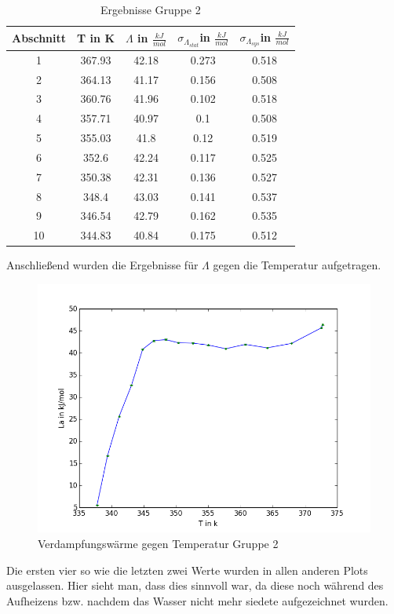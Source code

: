 \documentclass[12pt,a4paper]{article}
\begin{document}
\begin{table}[H]\centering
\caption{Ergebnisse Gruppe 2}
\begin{tabular}{c|c|c|c|c}
Abschnitt&T in K&$\Lambda$ in $\frac{kJ}{mol}$&$\sigma_{\Lambda_{stat}}$in $\frac{kJ}{mol}$&$\sigma_{\Lambda_{sys}}$in $\frac{kJ}{mol}$\\
\hline
1&367.93&42.18&0.273&0.518\\
2&364.13&41.17&0.156&0.508\\
3&360.76&41.96&0.102&0.518\\
4&357.71&40.97&0.1&0.508\\
5&355.03&41.8&0.12&0.519\\
6&352.6&42.24&0.117&0.525\\
7&350.38&42.31&0.136&0.527\\
8&348.4&43.03&0.141&0.537\\
9&346.54&42.79&0.162&0.535\\
10&344.83&40.84&0.175&0.512\\
\end{tabular}
\end{table}
Anschließend wurden die Ergebnisse für $\Lambda$ gegen die Temperatur aufgetragen.
\begin{figure}[H]
\centering
\includegraphics[scale=0.7]{Bilder/lamda_EL_neuerFehler.png}
\caption{Verdampfungswärme gegen Temperatur Gruppe 2}
\end{figure}
Die ersten vier so wie die letzten zwei Werte wurden in allen anderen Plots ausgelassen. Hier sieht man, dass dies sinnvoll war, da diese noch während des Aufheizens bzw. nachdem das Wasser nicht mehr siedete aufgezeichnet wurden. 
\end{document}
